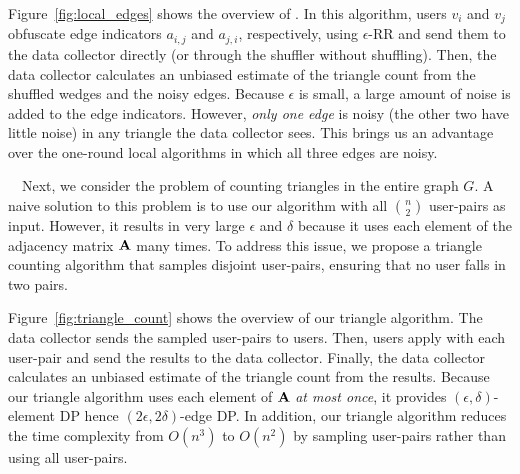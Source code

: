 Figure~\ref{fig:local_edges} shows the overview of \AlgWSLE{}.
In this algorithm, users $v_i$ and $v_j$ obfuscate edge indicators $a_{i,j}$ and $a_{j,i}$, respectively, using $\epsilon$-RR and send them to the data collector directly (or through the shuffler without shuffling).
Then, the data collector calculates an unbiased estimate of the triangle count
from the shuffled wedges and the noisy edges.
Because $\epsilon$ is small, a large amount of noise is added to the edge indicators.
However, \textit{only one edge} is noisy (the other two have little noise) in any triangle the data collector sees.
This brings us an advantage over the one-round local algorithms in which all three edges are noisy.

\smallskip
{}~~Next, we consider the problem of counting triangles in the entire graph $G$.
A naive solution to this problem is to use our
\AlgWSLE{} algorithm
with all $\binom{n}{2}$ user-pairs as input.
However, it results in very large $\epsilon$ and $\delta$ because it uses each element of the adjacency matrix $\mathbf{A}$ many times.
To address this issue,
we propose a triangle counting algorithm that samples
disjoint user-pairs, ensuring that no user falls in two pairs. 

Figure~\ref{fig:triangle_count} shows the overview of our triangle algorithm.
The data collector sends the sampled user-pairs to users.
Then, users apply
\AlgWSLE{}
with each user-pair
and send the results to the data collector.
Finally, the data collector calculates an unbiased estimate of the triangle count from the results.
Because our triangle algorithm uses each element of
$\mathbf{A}$ \textit{at most once}, it provides $(\epsilon,\delta)$-element DP hence $(2\epsilon,2\delta)$-edge DP.
In addition, our triangle algorithm reduces the time complexity from $O(n^3)$ to $O(n^2)$ by sampling user-pairs rather than using all user-pairs.

